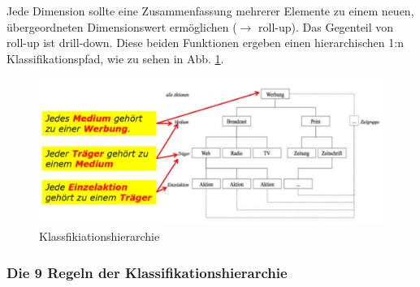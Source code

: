 \documentclass[a4paper, 11pt, nofootinbib]{article}
\begin{document}
Jede Dimension sollte eine Zusammenfassung mehrerer Elemente zu einem neuen, übergeordneten Dimensionswert ermöglichen ($\rightarrow$ roll-up). Das Gegenteil von roll-up ist drill-down. Diese beiden Funktionen ergeben einen hierarchischen 1:n Klassifikationspfad, wie zu sehen in Abb. \ref{fig:dimhier}.

\begin{figure}[htb]
	\centering
	\includegraphics[keepaspectratio=true,height=15\baselineskip]{dimension_hierarchy.jpg}
	\caption{Klassfikiationshierarchie}
	\label{fig:dimhier}
\end{figure}

\subsubsection{Die 9 Regeln der Klassifikationshierarchie}
\end{document}

